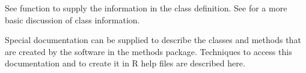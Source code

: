%
\begin{SeeAlso}\relax
See function  to supply the information in the
class definition.
See  for a more basic discussion of class information.
\end{SeeAlso}
%
\begin{Description}\relax
Special documentation can be supplied to describe the
classes and methods that are created by the software in the methods
package.  Techniques to access this documentation and to create it
in R help files are described here.
\end{Description}
%
